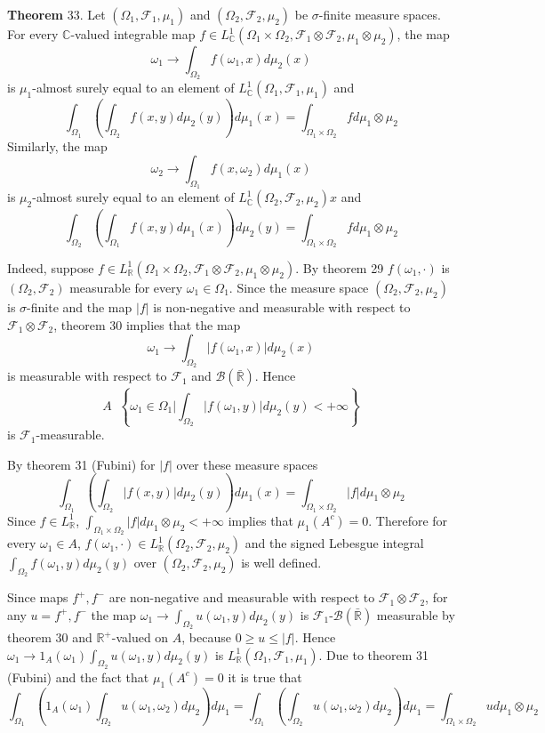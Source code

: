 \documentclass[a4paper]{article}
\newcommand{\obj}[1]{\left\{ #1 \right \}}
\newcommand{\brac}[1]{\left ( #1 \right )}
\newcommand{\induc}[1]{\left . #1 \right \vert}
\newcommand{\abs}[1]{\left | #1 \right |}
\newcommand{\Rbar}{{\bar{\mathbb{R}}}}
\newcommand{\Real}{\mathbb{R}}
\newcommand{\Cplx}{\mathbb{C}}
\newcommand{\Fcal}{\mathcal{F}}
\newcommand{\borel}[1]{\mathcal{B}\brac{#1}}
\newcommand{\defn}{\mathop{\overset{\Delta}{=}}\nolimits}
\begin{document}
\label{thm:fubini4} \noindent \textbf{Theorem} 33.
Let $\brac{\Omega_1, \Fcal_1, \mu_1}$ and $\brac{\Omega_2, \Fcal_2, \mu_2}$ be $\sigma$-finite measure spaces. For every $\Cplx$-valued integrable map $f\in L^1_\Cplx\brac{\Omega_1\times\Omega_2, \Fcal_1\otimes\Fcal_2, \mu_1\otimes\mu_2}$, the map \[\omega_1\to\int_{\Omega_2} f\brac{\omega_1, x} d\mu_2\brac{x}\] is $\mu_1$-almost surely equal to an element of $L^1_\Cplx\brac{\Omega_1,\Fcal_1, \mu_1}$ and \[\int_{\Omega_1} \brac{ \int_{\Omega_2} f\brac{x, y} d\mu_2\brac{y} } d\mu_1\brac{x} = \int_{\Omega_1\times\Omega_2} f d\mu_1\otimes\mu_2\] Similarly, the map\[\omega_2\to\int_{\Omega_1} f\brac{x, \omega_2} d\mu_1\brac{x}\] is $\mu_2$-almost surely equal to an element of $L^1_\Cplx\brac{\Omega_2,\Fcal_2, \mu_2}x$ and \[\int_{\Omega_2} \brac{ \int_{\Omega_1} f\brac{x, y} d\mu_1\brac{x} } d\mu_2\brac{y} = \int_{\Omega_1\times\Omega_2} f d\mu_1\otimes\mu_2\]

Indeed, suppose  $f\in L^1_\Real\brac{\Omega_1\times\Omega_2, \Fcal_1\otimes\Fcal_2, \mu_1\otimes\mu_2}$. By theorem 29 $f\brac{\omega_1, \cdot}$ is $\brac{\Omega_2, \Fcal_2}$ measurable for every $\omega_1\in\Omega_1$. Since the measure space $\brac{\Omega_2, \Fcal_2, \mu_2}$ is $\sigma$-finite and the map $\abs{f}$ is non-negative and measurable with respect to $\Fcal_1\otimes \Fcal_2$, theorem 30 implies that the map \[\omega_1\to\int_{\Omega_2} \abs{f\brac{\omega_1, x}} d\mu_2\brac{x}\] is measurable with respect to $\Fcal_1$ and $\borel{\Rbar}$. Hence \[A\defn \obj{ \induc{ \omega_1\in \Omega_1 } \int_{\Omega_2} \abs{ f\brac{\omega_1, y } } d\mu_2\brac{y} < +\infty }\] is $\Fcal_1$-measurable.

By theorem 31 (Fubini) for $\abs{f}$ over these measure spaces \[\int_{\Omega_1} \brac{ \int_{\Omega_2} \abs{f\brac{x, y}} d\mu_2\brac{y} } d\mu_1\brac{x} = \int_{\Omega_1\times\Omega_2} \abs{f} d\mu_1\otimes\mu_2\] Since $f\in L^1_\Real$, $\int_{\Omega_1\times\Omega_2} \abs{f} d\mu_1\otimes\mu_2 < +\infty$ implies that $\mu_1\brac{ A^c } = 0$. Therefore for every $\omega_1\in A$, $f\brac{\omega_1, \cdot}\in L^1_\Real\brac{\Omega_2, \Fcal_2, \mu_2}$ and the signed Lebesgue integral $\int_{\Omega_2} f\brac{\omega_1, y} d\mu_2\brac{y}$ over $\brac{\Omega_2, \Fcal_2, \mu_2}$ is well defined.

Since maps $f^+, f^-$ are non-negative and measurable with respect to $\Fcal_1\otimes \Fcal_2$, for any $u = f^+,f^-$ the map $\omega_1\to\int_{\Omega_2} u \brac{\omega_1, y} d\mu_2\brac{y}$ is $\Fcal_1$-$\borel{\Rbar}$ measurable by theorem 30 and $\Real^+$-valued on $A$, because $0\geq u\leq \abs{f}$. Hence $\omega_1\to 1_A\brac{\omega_1} \int_{\Omega_2} u\brac{\omega_1, y} d\mu_2\brac{y}$ is $L^1_\Real\brac{\Omega_1, \Fcal_1, \mu_1}$. Due to theorem 31 (Fubini) and the fact that $\mu_1\brac{A^c} = 0$ it is true that \[\int_{\Omega_1} \brac{ 1_A\brac{\omega_1}\int_{\Omega_2} u\brac{\omega_1, \omega_2} d\mu_2 } d\mu_1 = \int_{\Omega_1} \brac{ \int_{\Omega_2} u\brac{\omega_1, \omega_2} d\mu_2 } d\mu_1 = \int_{\Omega_1\times\Omega_2} u d\mu_1\otimes\mu_2\]
\end{document}
